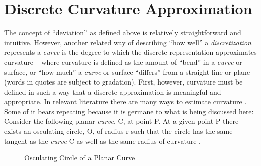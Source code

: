 \section{Discrete Curvature Approximation}
The concept of ``deviation'' as defined above is relatively straightforward and intuitive. However, another related way of describing ``how well'' a \textit{discretization} represents a \textit{curve} is the degree to which the discrete representation approximates curvature -- where curvature is defined as the amount of ``bend'' in a \textit{curve} or surface, or ``how much'' a \textit{curve} or surface ``differs'' from a straight line or plane (words in quotes are subject to gradation). First, however, curvature must be defined in such a way that a discrete approximation is meaningful and appropriate. In relevant literature there are many ways to estimate curvature \cite{hermann07}. Some of it bears repeating because it is germane to what is being discussed here: Consider the following planar \textit{curve}, C, at point P. At a given point P there exists an osculating circle, O, of radius r such that the circle has the same tangent as the \textit{curve} C as well as the same radius of curvature \cite{gray97}. \\

\begin{figure}[h!]
  \caption{\label{OsculatingCircle} Osculating Circle of a Planar Curve}
\end{figure}

